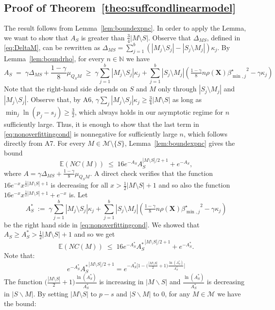 \documentclass[aos]{imsart}
\theoremstyle{plain}
\newcommand{\E}{\mathbb{E}}
\newcommand{\N}{\mathbb{N}}
\newcommand{\bs}{\boldsymbol}
\begin{document}
\begin{supplement}
\subsection{Proof of Theorem~\ref{theo:suffcondlinearmodel}} The result follows from Lemma~\ref{lem:boundexpnc}. In order to apply the Lemma, we want to show that $A_S$ is greater than $\tfrac{3}{4}|M\setminus S|$. Observe that $\Delta_{MS}$, defined in \eqref{eq:DeltaM}, can be rewritten as $\Delta_{MS}=\sum_{j=1}^b(|M_j\setminus S_j|-|S_j\setminus M_j|)\kappa_j$. By  Lemma~\ref{lem:boundrho}, for every $n\in \N$ we have 
\begin{equation}\label{eq:nonoverfittingcond}
   A_S\;=\; \gamma \Delta_{MS}+\frac{1-\gamma}{8}\mu_{Q_SM}\;\geq\; \gamma\sum_{j=1}^b|M_j \setminus S_j|\kappa_j + \sum_{j=1}^b |S_j\setminus M_j |\left(\tfrac{1-\gamma}{8} n \rho(\bs X) {\beta^{\star}_{\min,j}}^{2} - \gamma\kappa_j\right) 
\end{equation} 
Note that the right-hand side depends on $S$ and $M$ only through $|S_j\setminus M_j|$ and $|M_j\setminus S_j|$.  Observe that, by A6, $\gamma\sum_{j}|M_j\setminus S_j|\kappa_j\geq \tfrac{3}{4}|M\setminus S|$ as long as $\min_j \ln(p_j-s_j)\geq \tfrac32$, which always holds in our asymptotic regime for $n$ sufficiently large. Thus, it is enough to show that the last term in  \eqref{eq:nonoverfittingcond} is nonnegative for sufficiently large $n$, which follows directly from A7. For every $M\in \mathcal M\setminus \{S\}$, Lemma~\ref{lem:boundexpnc} gives the bound
$$
\E(NC(M))\;\leq\;16 e^{-A_S}A_S^{|M\setminus S|/2+1}+e^{-A_S},
$$
where $A=\gamma\Delta_{MS}+\tfrac{1-\gamma}{8}\mu_{Q_SM}$. A direct check verifies that the function $16 e^{-x}x^{\tfrac12|M\setminus S|+1}$ is decreasing for all $x>\tfrac12|M\setminus S|+1$ and so also the function $16 e^{-x}x^{\tfrac12|M\setminus S|+1}+e^{-x}$ is. Let 
$$A_S^*\;:=\;\gamma\sum_{j=1}^b|M_j \setminus S_j|\kappa_j + \sum_{j=1}^b |S_j\setminus M_j |\left(\tfrac{1-\gamma}{8} n \rho(\bs X) {\beta^{\star}_{\min,j}}^{2} - \gamma\kappa_j\right) $$
be the right hand side in \eqref{eq:nonoverfittingcond}. We showed that $A_S\geq A_S^*>\tfrac12|M\setminus S|+1$ and so we get 
$$
\E(NC(M))\;\leq\;16 e^{-A_S^*}{A_S^*}^{|M\setminus S|/2+1}+e^{-A_S^*}.
$$
Note that:
$$
    e^{-A_S^*}{A_S^*}^{|M\setminus S|/2+1} 
    =e^{-A_S^*\big[1-\big(\frac{|M\setminus S|}{2}+1\big)\frac{\ln(A_S^*)}{A_S^*}\big]}
$$
The function $\big(\frac{|M\setminus S|}{2}+1\big)\frac{\ln(A_S^*)}{A_S^*}$ is increasing in $|M\backslash S|$ and $\frac{\ln(A_S^*)}{A_S^*}$ is decreasing in $|S\backslash M|$. By setting $|M\setminus S|$ to $p-s$ and $|S\backslash M|$ to 0, for any $M\in \mathcal{M}$ we have the bound:

\end{supplement}
\end{document}
